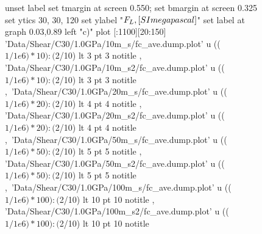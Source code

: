 \documentclass[aps,prb,reprint,superscriptaddress, a4paper]{revtex4-1}
\begin{document}
\begin{figure}
\begin{center}
\begin{gnuplot}[terminal=pdf, terminaloptions={size \SERFigwidth cm, \SERFigheight cm color solid}]
			unset label
			set tmargin at screen 0.550; set bmargin at screen 0.325
			set ytics 30, 30, 120 
			set ylabel "$F_L \\, [\\SI{}{\\mega\\pascal}]$"          
			set label at graph 0.03,0.89 left "c)"
			plot  [:1100][20:150]	'Data/Shear/C30/1.0GPa/10m_s/fc_ave.dump.plot' u (($1/1e6)*10):($2/10)  lt 3 pt 3 notitle  , 'Data/Shear/C30/1.0GPa/10m_s2/fc_ave.dump.plot' u (($1/1e6)*10):($2/10)   lt 3 pt 3 notitle   ,\
							'Data/Shear/C30/1.0GPa/20m_s/fc_ave.dump.plot' u (($1/1e6)*20):($2/10)  lt 4 pt 4 notitle  , 'Data/Shear/C30/1.0GPa/20m_s2/fc_ave.dump.plot' u (($1/1e6)*20):($2/10)   lt 4 pt 4 notitle   ,\
							'Data/Shear/C30/1.0GPa/50m_s/fc_ave.dump.plot' u (($1/1e6)*50):($2/10)   lt 5 pt 5 notitle  , 'Data/Shear/C30/1.0GPa/50m_s2/fc_ave.dump.plot'  u (($1/1e6)*50):($2/10)  lt 5 pt 5 notitle  ,\
							'Data/Shear/C30/1.0GPa/100m_s/fc_ave.dump.plot' u (($1/1e6)*100):($2/10) lt 10 pt 10 notitle  , 'Data/Shear/C30/1.0GPa/100m_s2/fc_ave.dump.plot'  u (($1/1e6)*100):($2/10) lt 10 pt 10 notitle  


\end{gnuplot}
\end{center}
\end{figure}
\end{document}
